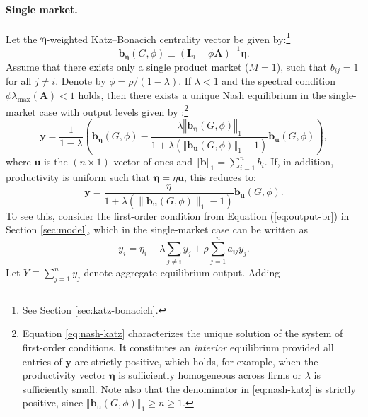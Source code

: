 \paragraph{Single market.}
Let the $\boldsymbol{\eta}$-weighted Katz--Bonacich centrality vector be given
by:\footnote{See Section \ref{sec:katz-bonacich}.} %
\[
\mathbf{b}_{\boldsymbol{\eta}}\left(G,\phi\right) \equiv \left(\mathbf{I}_n - \phi \mathbf{A}\right)^{-1} \boldsymbol{\eta} .
\]
Assume that there exists only a single product market ($M=1$), such that
$b_{ij}=1$ for all $j \neq i$. Denote by $\phi=\rho/(1-\lambda)$. If
$\lambda<1$ and the spectral condition
$\phi \lambda_{\max}\left( \mathbf{A}\right)<1$ holds, then there exists a
unique Nash equilibrium in the single-market case with output levels given by
\citep[cf.][]{Konig2018}:\footnote{Equation \eqref{eq:nash-katz} characterizes
the unique solution of the system of first-order conditions. It constitutes an
\emph{interior} equilibrium provided all entries of $\mathbf y$ are strictly
positive, which holds, for example, when the productivity vector
$\boldsymbol\eta$ is sufficiently homogeneous across firms or $\lambda$ is
sufficiently small. Note also that the denominator in \eqref{eq:nash-katz} is
strictly positive, since
$\left\Vert\mathbf b_{\mathbf u}(G,\phi)\right\Vert_1\geq n\geq 1$.}
\begin{equation}
\mathbf{y} = \frac{1}{1-\lambda } \left( \mathbf{b}_{\boldsymbol{\eta}}(G,\phi ) - \frac{\lambda \left\Vert \mathbf{b}_{\boldsymbol{\eta}}(G,\phi )\right\Vert_{1}}{1+\lambda(\left\Vert \mathbf{b}_{\mathbf{u}}(G,\phi )\right\Vert_{1}-1)} \mathbf{b}_{\mathbf{u}}(G,\phi ) \right),
\label{eq:nash-katz}
\end{equation}
where $\mathbf{u}$ is the $(n \times 1)$-vector of ones and $\left\Vert
\mathbf{b} \right\Vert_{1} = \sum_{i=1}^n b_i$. If, in addition, productivity
is uniform such that $\boldsymbol{\eta} = \eta \mathbf{u}$, this reduces to:
\begin{equation}
\mathbf{y} = \frac{\eta}{1+\lambda (\|\mathbf{b}_{\mathbf{u}}\left(G,\phi\right)\|_1-1)} \mathbf{b}_{\mathbf{u}}\left(G,\phi\right).
\label{eq:nash-bonacich-single-market}
\end{equation}
To see this, consider the first-order condition from Equation
(\ref{eq:output-br}) in Section \ref{sec:model}, which in the single-market
case can be written as
\[
y_{i} = \eta_{i} - \lambda \sum_{j\not=i}y_{j} + \rho \sum_{j=1}^{n}a_{ij}y_{j}.
\]
Let $Y \equiv \sum_{j=1}^n y_{j}$ denote aggregate equilibrium output. Adding
